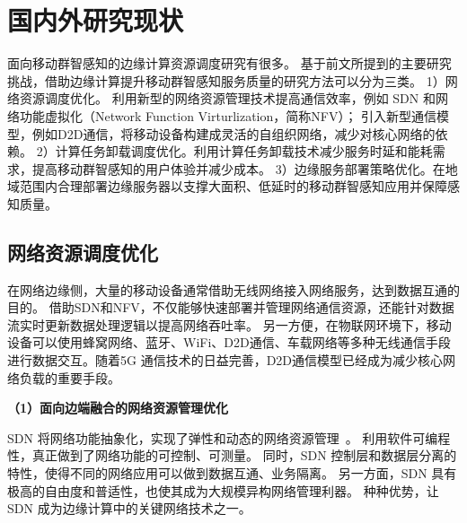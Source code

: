 \section{国内外研究现状}

面向移动群智感知的边缘计算资源调度研究有很多。
基于前文所提到的主要研究挑战，借助边缘计算提升移动群智感知服务质量的研究方法可以分为三类。
1）网络资源调度优化。%
利用新型的网络资源管理技术提高通信效率，例如 SDN 和网络功能虚拟化（Network Function Virturlization，简称NFV）；
引入新型通信模型，例如D2D通信，将移动设备构建成灵活的自组织网络，减少对核心网络的依赖。
2）计算任务卸载调度优化。利用计算任务卸载技术减少服务时延和能耗需求，提高移动群智感知的用户体验并减少成本。
3）边缘服务部署策略优化。在地域范围内合理部署边缘服务器以支撑大面积、低延时的移动群智感知应用并保障感知质量。

\subsection{网络资源调度优化}

在网络边缘侧，大量的移动设备通常借助无线网络接入网络服务，达到数据互通的目的。
借助SDN和NFV，不仅能够快速部署并管理网络通信资源，还能针对数据流实时更新数据处理逻辑以提高网络吞吐率。
另一方便，在物联网环境下，移动设备可以使用蜂窝网络、蓝牙、WiFi、D2D通信、车载网络等多种无线通信手段进行数据交互。随着5G 通信技术的日益完善，D2D通信模型已经成为减少核心网络负载的重要手段。

\textbf{（1）面向边端融合的网络资源管理优化}

SDN 将网络功能抽象化，实现了弹性和动态的网络资源管理~\cite{DBLP:journals/jzusc/WangWYG18}。
利用软件可编程性，真正做到了网络功能的可控制、可测量。
同时，SDN 控制层和数据层分离的特性，使得不同的网络应用可以做到数据互通、业务隔离。
另一方面，SDN 具有极高的自由度和普适性，也使其成为大规模异构网络管理利器。
种种优势，让 SDN 成为边缘计算中的关键网络技术之一。


